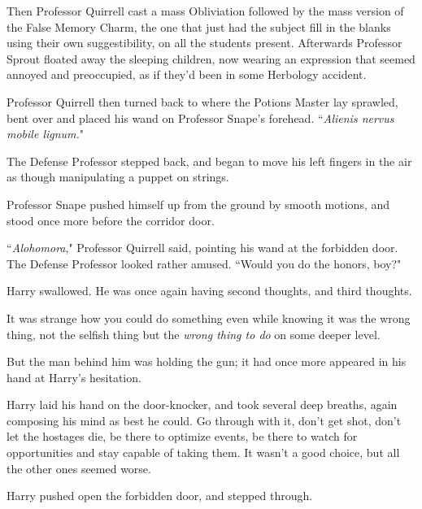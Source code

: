 Then Professor Quirrell cast a mass Obliviation followed by the mass version of the False Memory Charm, the one that just had the subject fill in the blanks using their own suggestibility, on all the students present. Afterwards Professor Sprout floated away the sleeping children, now wearing an expression that seemed annoyed and preoccupied, as if they'd been in some Herbology accident.

Professor Quirrell then turned back to where the Potions Master lay sprawled, bent over and placed his wand on Professor Snape's forehead. ``\emph{Alienis nervus mobile lignum.}"

The Defense Professor stepped back, and began to move his left fingers in the air as though manipulating a puppet on strings.

Professor Snape pushed himself up from the ground by smooth motions, and stood once more before the corridor door.

``\emph{Alohomora}," Professor Quirrell said, pointing his wand at the forbidden door. The Defense Professor looked rather amused. ``Would you do the honors, boy?"

Harry swallowed. He was once again having second thoughts, and third thoughts.

It was strange how you could do something even while knowing it was the wrong thing, not the selfish thing but the \emph{wrong thing to do} on some deeper level.

But the man behind him was holding the gun; it had once more appeared in his hand at Harry's hesitation.

Harry laid his hand on the door-knocker, and took several deep breaths, again composing his mind as best he could. Go through with it, don't get shot, don't let the hostages die, be there to optimize events, be there to watch for opportunities and stay capable of taking them. It wasn't a good choice, but all the other ones seemed worse.\nopagebreak

Harry pushed open the forbidden door, and stepped through.

